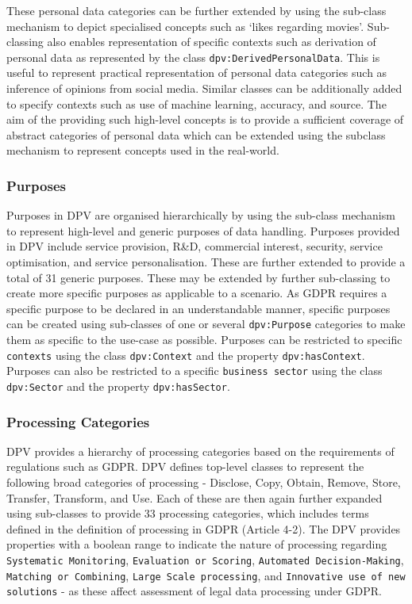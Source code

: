 These personal data categories can be further extended by using the sub-class mechanism to depict specialised concepts such as `likes regarding movies'.
Sub-classing also enables representation of specific contexts such as derivation of personal data as represented by the class \texttt{dpv:DerivedPersonalData}.
This is useful to represent practical representation of personal data categories such as inference of opinions from social media.
Similar classes can be additionally added to specify contexts such as use of machine learning, accuracy, and source.
The aim of the providing such high-level concepts is to provide a sufficient coverage of abstract categories of personal data which can be extended using the subclass mechanism to represent concepts used in the real-world. 

\subsubsection{Purposes}
Purposes in DPV are organised hierarchically by using the sub-class mechanism to represent high-level and generic purposes of data handling.
Purposes provided in DPV include service provision, R\&D, commercial interest, security, service optimisation, and service personalisation. These are further extended to provide a total of 31 generic purposes.
These may be extended by further sub-classing to create more specific purposes as applicable to a scenario.
As GDPR requires a specific purpose to be declared in an understandable manner, specific purposes can be created using sub-classes of one or several \texttt{dpv:Purpose} categories to make them as specific to the use-case as possible.
 Purposes can be restricted to specific \texttt{contexts} using the class \texttt{dpv:Context} and the property \texttt{dpv:hasContext}.
Purposes can also be restricted to a specific \texttt{business sector} using the class \texttt{dpv:Sector} and the property \texttt{dpv:hasSector}.

\subsubsection{Processing Categories}
DPV provides a hierarchy of processing categories based on the requirements of regulations such as GDPR. 
DPV defines top-level classes to represent the following broad categories of processing - Disclose, Copy, Obtain, Remove, Store, Transfer, Transform, and Use.
Each of these are then again further expanded using sub-classes to provide 33 processing categories, which includes terms defined in the definition of processing in GDPR (Article 4-2).
The DPV provides properties with a boolean range to indicate the nature of processing regarding \texttt{Systematic Monitoring}, \texttt{Evaluation or Scoring}, \texttt{Automated Decision-Making}, \texttt{Matching or Combining}, \texttt{Large Scale processing}, and \texttt{Innovative use of new solutions} - as these affect assessment of legal data processing under GDPR.

